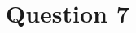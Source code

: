 \documentclass[../CSC_5RO12_TA_TP3.tex]{subfiles}
\begin{document}
\section{Question 7}
\end{document}
